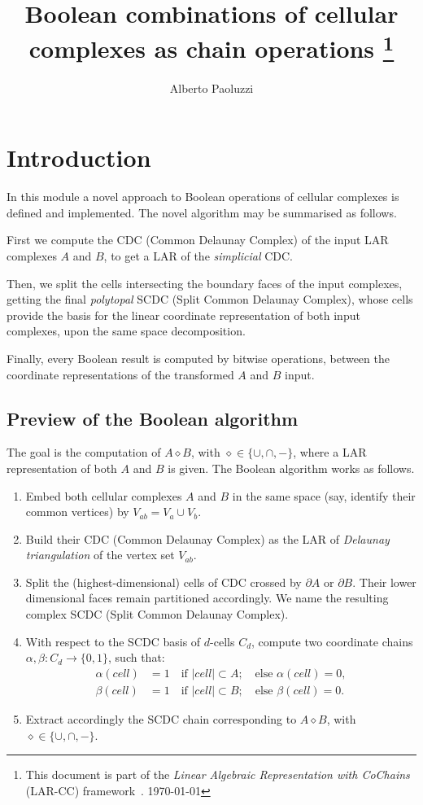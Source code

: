 \documentclass[11pt,oneside]{article}	%
\title{Boolean combinations of cellular complexes as chain operations
\footnote{This document is part of the \emph{Linear Algebraic Representation with CoChains} (LAR-CC) framework~\cite{cclar-proj:2013:00}. \today}
}
\author{Alberto Paoluzzi}
\begin{document}
\maketitle
\tableofcontents
\nonstopmode

\section{Introduction}

In this module a novel approach to Boolean operations of cellular complexes is defined and implemented. The novel algorithm may be summarised as follows. 

First we compute the CDC (Common Delaunay Complex) of the input LAR complexes $A$ and $B$, to get a LAR of the \emph{simplicial} CDC.

Then, we split the cells intersecting the boundary faces of the input complexes, getting the final \emph{polytopal} SCDC  
(Split Common Delaunay Complex), whose cells  provide the  basis for the linear coordinate representation of both input 
complexes, upon the same space decomposition.

Finally, every Boolean result is computed by bitwise operations, between the coordinate representations of the transformed 
$A$ and $B$ input.



\subsection{Preview of the Boolean algorithm}

The goal is the computation of $A \diamond B$, with $\diamond\in \{\cup, \cap, -\}$, where a LAR representation of both $A$ and $B$ is given. The Boolean algorithm works as follows.

\begin{enumerate}
\item 
Embed both cellular complexes $A$ and $B$ in the same space (say, identify their common vertices) by $V_{ab} = V_a \cup V_b$.
\item 
Build their CDC  (Common Delaunay Complex) as the LAR of \emph{Delaunay triangulation} of the vertex set $V_{ab}$.
\item 
Split the (highest-dimensional) cells of CDC crossed by $\partial A$ or $\partial B$. Their lower dimensional faces remain partitioned accordingly. We name the resulting complex SCDC (Split Common Delaunay Complex).
\item 
With respect to the SCDC basis of $d$-cells $C_d$, compute two coordinate chains $\alpha,\beta: C_d \to \{0,1\}$, such that: 
\begin{align}
	\alpha(cell) &= 1  \quad\mbox{if\ } |cell| \subset A;  \quad\mbox{else\ } \alpha(cell) = 0, \nonumber\\
	\beta(cell) &= 1  \quad\mbox{if\ } |cell| \subset B;  \quad\mbox{else\ } \beta(cell) = 0. \nonumber
\end{align}
\item 
Extract accordingly the SCDC chain corresponding to $A \diamond B$, with $\diamond\in \{\cup, \cap, -\}$.
\end{enumerate}
\end{document}
